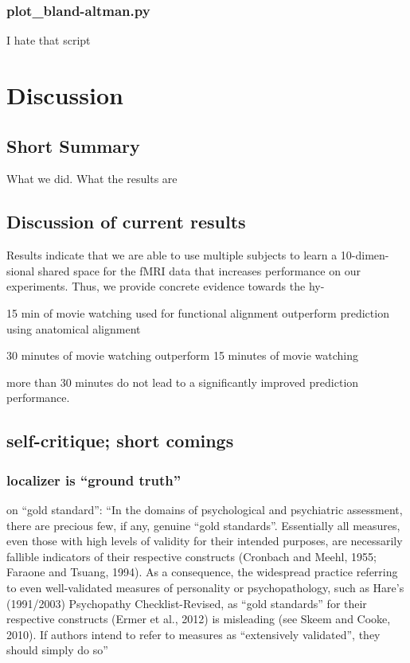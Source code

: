 \subsubsection{plot\_bland-altman.py}

I hate that script



\section{Discussion}


\subsection{Short Summary}

What we did. What the results are

\subsection{Discussion of current results}

Results indicate that we are able to use multiple subjects to learn a 10-dimen-
sional shared space for the fMRI data that increases performance on our
experiments. Thus, we provide concrete evidence towards the hy-

%
15 min of movie watching used for functional alignment outperform prediction
using anatomical alignment

%
30 minutes of movie watching outperform 15 minutes of movie watching

%
more than 30 minutes do not lead to a significantly improved prediction
performance.
%

\subsection{self-critique; short comings}


\subsubsection{localizer is ``ground truth''}

\citet{lilienfeld2015fifty} on ``gold standard'': ``In the domains of
psychological and psychiatric assessment, there are precious few, if any,
genuine ``gold standards''. Essentially all measures, even those with high
levels of validity for their intended purposes, are necessarily fallible
indicators of their respective constructs (Cronbach and Meehl, 1955; Faraone and
Tsuang, 1994). As a consequence, the widespread practice referring to even
well-validated measures of personality or psychopathology, such as Hare’s
(1991/2003) Psychopathy Checklist-Revised, as ``gold standards'' for their
respective constructs (Ermer et al., 2012) is misleading (see Skeem and Cooke,
2010). If authors intend to refer to measures as ``extensively validated'', they
should simply do so'' \citep{lilienfeld2015fifty}

